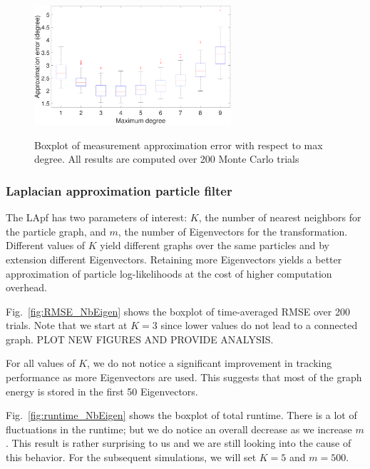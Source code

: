 \documentclass[10pt,letterpaper,final]{article}
\begin{document}
\begin{figure}
\centering
\includegraphics[width=0.65\textwidth]{Figures/LCpf_approx_error.pdf}
\label{fig:LCpf_approx_error}
\caption{Boxplot of measurement approximation error with respect to max degree. All results are computed over 200 Monte Carlo trials}
\end{figure}

\subsubsection{Laplacian approximation particle filter}
The LApf has two parameters of interest: $K$, the number of nearest neighbors for the particle graph, and $m$, the number of Eigenvectors for the transformation. Different values of $K$ yield different graphs over the same particles and by extension different Eigenvectors. Retaining more Eigenvectors yields a better approximation of particle log-likelihoods at the cost of higher computation overhead. 

Fig.~\ref{fig:RMSE_NbEigen} shows the boxplot of time-averaged RMSE over 200 trials. Note that we start at $K=3$ since lower values do not lead to a connected graph. PLOT NEW FIGURES AND PROVIDE ANALYSIS.

For all values of $K$, we do not notice a significant improvement in tracking performance as more Eigenvectors are used. This suggests that most of the graph energy is stored in the first 50 Eigenvectors. 

Fig.~\ref{fig:runtime_NbEigen} shows the boxplot of total runtime. There is a lot of fluctuations in the runtime; but we do notice an overall decrease as we increase $m$. This result is rather surprising to us and we are still looking into the cause of this behavior. For the subsequent simulations, we will set $K=5$ and $m=500$. 
\end{document}
